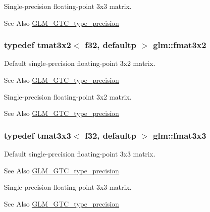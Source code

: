 Single-\/precision floating-\/point 3x3 matrix. \begin{DoxySeeAlso}{See Also}
\hyperlink{group__gtc__type__precision}{G\-L\-M\-\_\-\-G\-T\-C\-\_\-type\-\_\-precision} 
\end{DoxySeeAlso}
\hypertarget{group__gtc__type__precision_gab194ac1a68dbcb228384112ebe531c67}{
\subsubsection[{fmat3x2}]{\setlength{\rightskip}{0pt plus 5cm}typedef tmat3x2$<$ f32, defaultp $>$ {\bf glm\-::fmat3x2}}}\label{group__gtc__type__precision_gab194ac1a68dbcb228384112ebe531c67}
Default single-\/precision floating-\/point 3x2 matrix. \begin{DoxySeeAlso}{See Also}
\hyperlink{group__gtc__type__precision}{G\-L\-M\-\_\-\-G\-T\-C\-\_\-type\-\_\-precision}
\end{DoxySeeAlso}
Single-\/precision floating-\/point 3x2 matrix. \begin{DoxySeeAlso}{See Also}
\hyperlink{group__gtc__type__precision}{G\-L\-M\-\_\-\-G\-T\-C\-\_\-type\-\_\-precision} 
\end{DoxySeeAlso}
\hypertarget{group__gtc__type__precision_ga577209f19554f5291cc3d66dda9a4388}{
\subsubsection[{fmat3x3}]{\setlength{\rightskip}{0pt plus 5cm}typedef tmat3x3$<$ f32, defaultp $>$ {\bf glm\-::fmat3x3}}}\label{group__gtc__type__precision_ga577209f19554f5291cc3d66dda9a4388}
Default single-\/precision floating-\/point 3x3 matrix. \begin{DoxySeeAlso}{See Also}
\hyperlink{group__gtc__type__precision}{G\-L\-M\-\_\-\-G\-T\-C\-\_\-type\-\_\-precision}
\end{DoxySeeAlso}
Single-\/precision floating-\/point 3x3 matrix. \begin{DoxySeeAlso}{See Also}
\hyperlink{group__gtc__type__precision}{G\-L\-M\-\_\-\-G\-T\-C\-\_\-type\-\_\-precision} 
\end{DoxySeeAlso}
